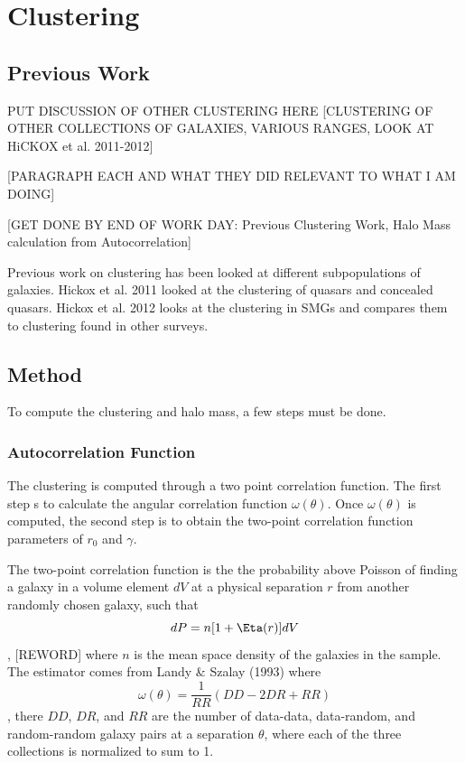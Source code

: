 \chapter{Clustering}

\section{Previous Work}

PUT DISCUSSION OF OTHER CLUSTERING HERE [CLUSTERING OF OTHER COLLECTIONS OF GALAXIES, VARIOUS RANGES, LOOK AT HiCKOX et al. 2011-2012]

[PARAGRAPH EACH AND WHAT THEY DID RELEVANT TO WHAT I AM DOING]

[GET DONE BY END OF WORK DAY: Previous Clustering Work, Halo Mass calculation from Autocorrelation]

Previous work on clustering has been looked at different subpopulations of galaxies. Hickox et al. 2011 looked at the clustering of quasars and concealed quasars. Hickox et al. 2012 looks at the clustering in SMGs and compares them to clustering found in other surveys. 

\section{Method}

To compute the clustering and halo mass, a few steps must be done. 

\subsection{Autocorrelation Function}

The clustering is computed through a two point correlation function. The first step s to calculate the angular correlation function $ \omega(\theta)$. Once $ \omega(\theta)$ is computed, the second step is to obtain the two-point correlation function parameters of $r_0$ and $\gamma$.

The two-point correlation function is the the probability above Poisson of finding a galaxy in a volume element $dV$ at a physical separation $r$ from another randomly chosen galaxy, such that $$ dP = n[1 + \Eta(r)]dV$$, [REWORD] where $n$ is the mean space density of the galaxies in the sample. The estimator comes from Landy \& Szalay (1993) where $$ \omega(\theta) = \frac{1}{RR}(DD-2DR + RR)$$, there $DD$, $DR$, and $RR$ are the number of data-data, data-random, and random-random galaxy pairs at a separation $\theta$, where each of the three collections is normalized to sum to 1. 


